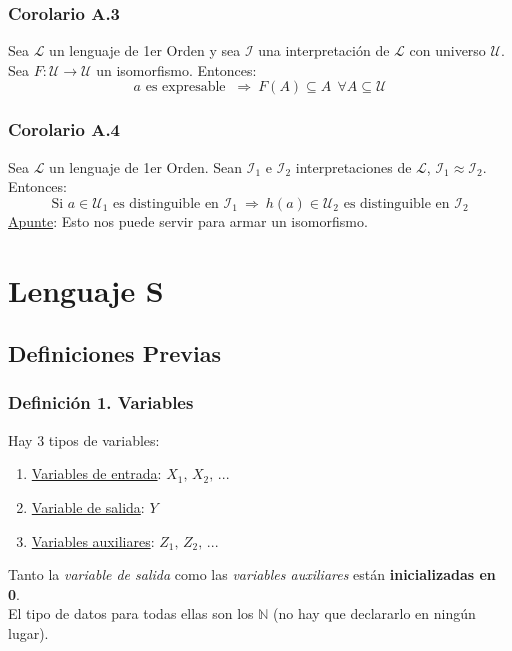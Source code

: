 \documentclass{article}
\newcommand{\comma}{,\,}                                %
\newcommand{\naturales}{\mathbb{N}}                     %
\newcommand{\lenguaje}{\mathcal{L}}
\newcommand{\interpretacion}{\mathcal{I}}
\newcommand{\universo}{\mathcal{U}}
\newcommand{\Rightarrows}{\: \Rightarrow \:}            %
\begin{document}
\subsubsection{Corolario A.3}
Sea $\lenguaje$ un lenguaje de 1er Orden y sea $\interpretacion$ una interpretación de $\lenguaje$ con universo $\universo$. Sea $F: \universo \rightarrow \universo$ un isomorfismo. Entonces:
\begin{equation*}
    a \text{ es expresable } \Rightarrows F(A) \subseteq A \:\: \forall A \subseteq \universo
\end{equation*}
\subsubsection{Corolario A.4}
Sea $\lenguaje$ un lenguaje de 1er Orden. Sean $\interpretacion_1$ e $\interpretacion_2$ interpretaciones de $\lenguaje$, $\interpretacion_1 \approx \interpretacion_2$. Entonces:
\begin{equation*}
    \text{Si } a \in \universo_1 \text{ es distinguible en } \interpretacion_1 \Rightarrows h(a) \in \universo_2 \text{ es distinguible en } \interpretacion_2
\end{equation*}
\underline{Apunte}: Esto nos puede servir para armar un isomorfismo.


\newpage
\section{Lenguaje S}
\subsection{Definiciones Previas}
\subsubsection*{Definición 1. Variables}
Hay 3 tipos de variables:
\begin{enumerate}
    \item \underline{Variables de entrada}: $X_1 \comma X_2 \comma ...$
    \item \underline{Variable de salida}: $Y$
    \item \underline{Variables auxiliares}: $Z_1 \comma Z_2 \comma ...$
\end{enumerate}
Tanto la \emph{variable de salida} como las \emph{variables auxiliares} están \textbf{inicializadas en 0}.
\\El tipo de datos para todas ellas son los $\naturales$ (no hay que declararlo en ningún lugar).
\end{document}
